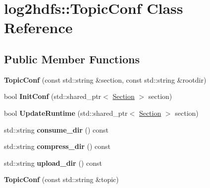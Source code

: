 \hypertarget{classlog2hdfs_1_1TopicConf}{}\section{log2hdfs\+:\+:Topic\+Conf Class Reference}
\label{classlog2hdfs_1_1TopicConf}
\subsection*{Public Member Functions}
\begin{DoxyCompactItemize}
\item 
{\bfseries Topic\+Conf} (const std\+::string \&section, const std\+::string \&rootdir)\hypertarget{classlog2hdfs_1_1TopicConf_a40be620420b87b5f1b80a6675c60beb2}{}\label{classlog2hdfs_1_1TopicConf_a40be620420b87b5f1b80a6675c60beb2}

\item 
bool {\bfseries Init\+Conf} (std\+::shared\+\_\+ptr$<$ \hyperlink{classlog2hdfs_1_1Section}{Section} $>$ section)\hypertarget{classlog2hdfs_1_1TopicConf_ae35b11051f7feb5203cf1f8d7efdbf89}{}\label{classlog2hdfs_1_1TopicConf_ae35b11051f7feb5203cf1f8d7efdbf89}

\item 
bool {\bfseries Update\+Runtime} (std\+::shared\+\_\+ptr$<$ \hyperlink{classlog2hdfs_1_1Section}{Section} $>$ section)\hypertarget{classlog2hdfs_1_1TopicConf_a7858567a96f4790bbb196576ca535e5e}{}\label{classlog2hdfs_1_1TopicConf_a7858567a96f4790bbb196576ca535e5e}

\item 
std\+::string {\bfseries consume\+\_\+dir} () const \hypertarget{classlog2hdfs_1_1TopicConf_a2cd48031f02615b895d479bf01c41ddc}{}\label{classlog2hdfs_1_1TopicConf_a2cd48031f02615b895d479bf01c41ddc}

\item 
std\+::string {\bfseries compress\+\_\+dir} () const \hypertarget{classlog2hdfs_1_1TopicConf_a3dc559a4cb24b275047983f2bc535ce3}{}\label{classlog2hdfs_1_1TopicConf_a3dc559a4cb24b275047983f2bc535ce3}

\item 
std\+::string {\bfseries upload\+\_\+dir} () const \hypertarget{classlog2hdfs_1_1TopicConf_ad2065d6901bd3f3401dce46389a744c4}{}\label{classlog2hdfs_1_1TopicConf_ad2065d6901bd3f3401dce46389a744c4}

\item 
{\bfseries Topic\+Conf} (const std\+::string \&topic)\hypertarget{classlog2hdfs_1_1TopicConf_ac99b8a0b746529f8141ad9121bc9dc97}{}\label{classlog2hdfs_1_1TopicConf_ac99b8a0b746529f8141ad9121bc9dc97}


\end{DoxyCompactItemize}
